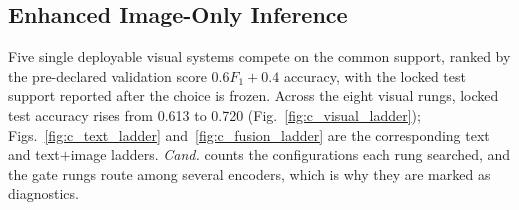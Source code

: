\documentclass[conference]{IEEEtran}
\begin{document}
\subsection{Enhanced Image-Only Inference}



Five single deployable visual systems compete on the common support, ranked by
the pre-declared validation score $0.6F_1+0.4$ accuracy, with the locked test
support reported after the choice is frozen. Across the eight visual rungs, locked
test accuracy rises from 0.613 to 0.720 (Fig.~\ref{fig:c_visual_ladder}); Figs.~\ref{fig:c_text_ladder} and~\ref{fig:c_fusion_ladder} are the corresponding text and text${+}$image ladders. \emph{Cand.} counts the configurations each rung searched, and the gate rungs route among several encoders, which is why they are marked as diagnostics.

\end{document}
